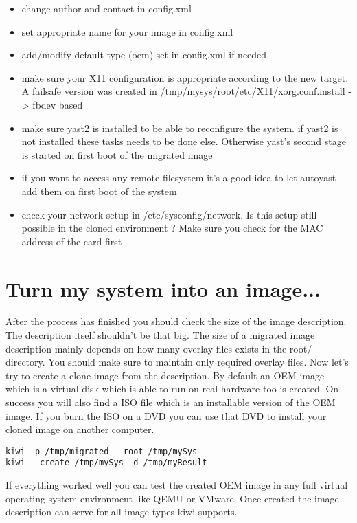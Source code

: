 \begin{itemize}
\item change author and contact in config.xml
\item set appropriate name for your image in config.xml
\item add/modify default type (oem) set in config.xml if needed
\item make sure your X11 configuration is appropriate according to
      the new target. A failsafe version was created in
      /tmp/mysys/root/etc/X11/xorg.conf.install -> fbdev based
\item make sure yast2 is installed to be able to reconfigure
      the system. if yast2 is not installed these tasks needs to
      be done else. Otherwise yast's second stage is started on first
      boot of the migrated image
\item if you want to access any remote filesystem it's a good
      idea to let autoyast add them on first boot of the system
\item check your network setup in /etc/sysconfig/network. Is this
      setup still possible in the cloned environment ? Make sure you
      check for the MAC address of the card first
\end{itemize}

\section{Turn my system into an image...}
After the process has finished you should check the size of the
image description. The description itself shouldn't be that big.
The size of a migrated image description mainly depends on how many
overlay files exists in the root/ directory. You should make
sure to maintain only required overlay files. Now let's try to create a
clone image from the description. By default an OEM image which is
a virtual disk which is able to run on real hardware too is created.
On success you will also find a ISO file which is an installable
version of the OEM image. If you burn the ISO on a DVD you can use
that DVD to install your cloned image on another computer.

\begin{Command}{14cm}
\begin{verbatim}
kiwi -p /tmp/migrated --root /tmp/mySys
kiwi --create /tmp/mySys -d /tmp/myResult
\end{verbatim}
\end{Command}

If everything worked well you can test the created OEM
image in any full virtual operating system environment like QEMU or
VMware. Once created the image description can serve for all image
types kiwi supports.
 
